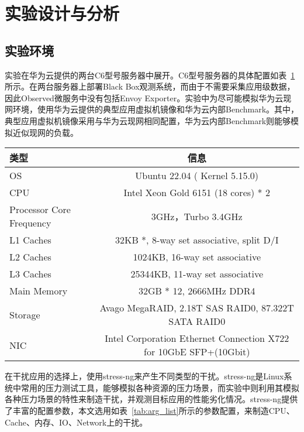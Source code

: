 \section{实验设计与分析}

\subsection{实验环境}

实验在华为云提供的两台C6型号服务器中展开。C6型号服务器的具体配置如表~\ref{tab:c6_info}所示。在两台服务器上部署Black Box观测系统，而由于不需要采集应用级数据，因此Observed微服务中没有包括Envoy Exporter。实验中为尽可能模拟华为云现网环境，使用华为云提供的典型应用虚拟机镜像和华为云内部Benchmark。其中，典型应用虚拟机镜像采用与华为云现网相同配置，华为云内部Benchmark则能够模拟近似现网的负载。

\begin{table}[!htbp]
    \label{tab:c6_info}
    \footnotesize%
    \setlength{\tabcolsep}{4pt}%
    \renewcommand{\arraystretch}{1.25}%
    \centering
    \begin{tabular}{lc}
        \hline
        类型 & 信息 \\
        \hline
        OS & Ubuntu 22.04 ( Kernel 5.15.0) \\
        CPU & Intel Xeon Gold 6151 (18 cores) * 2 \\
        Processor Core Frequency & 3GHz，Turbo 3.4GHz \\
        L1 Caches & 32KB *,  8-way set associative, split D/I \\
        L2 Caches & 1024KB, 16-way set associative \\
        L3 Caches & 25344KB, 11-way set associative \\
        Main Memory & 32GB * 12, 2666MHz DDR4 \\
        Storage & Avago MegaRAID, 2.18T SAS RAID0, 87.322T SATA RAID0 \\
        NIC & Intel Corporation Ethernet Connection X722 for 10GbE SFP+(10Gbit) \\
        \hline
    \end{tabular}
\end{table}

在干扰应用的选择上，使用stress-ng来产生不同类型的干扰。stress-ng是Linux系统中常用的压力测试工具，能够模拟各种资源的压力场景，而实验中则利用其模拟各种压力场景的特性来制造干扰，并观测目标应用的性能劣化情况。stress-ng提供了丰富的配置参数，本文选用如表~\ref{tab:arg_list}所示的参数配置，来制造CPU、Cache、内存、IO、Network上的干扰。

